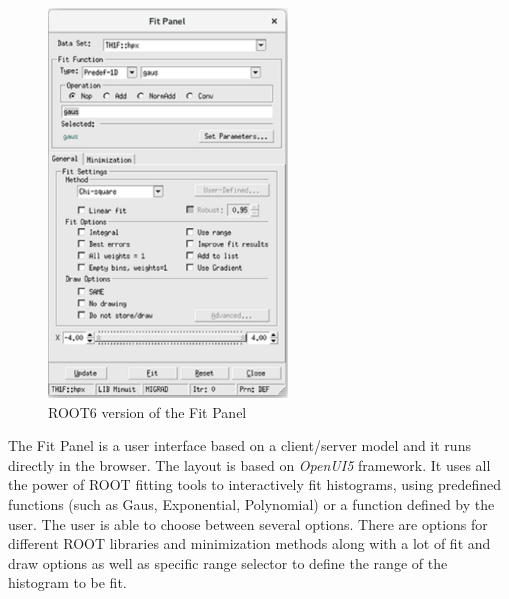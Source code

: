 \documentclass[a4paper]{jpconf}
\begin{document}
\begin{figure}[h]
\begin{minipage}{14pc}
\includegraphics[width=15pc]{oldPanel.eps}
\caption{\label{label}ROOT6 version of the Fit Panel}
\end{minipage}
\end{figure}

The Fit Panel is a user interface based on a client/server model and it runs directly
in the browser. The layout is based on \textit{OpenUI5} framework. It uses all the
power of ROOT fitting tools to interactively fit histograms, using predefined
functions (such as Gaus, Exponential, Polynomial)  or a function defined by
the user. The user is able to choose between several options. There are options
for different ROOT libraries and minimization methods along with a lot of fit
and draw options as well as specific range selector to define the range of the
histogram to be fit.
\end{document}
